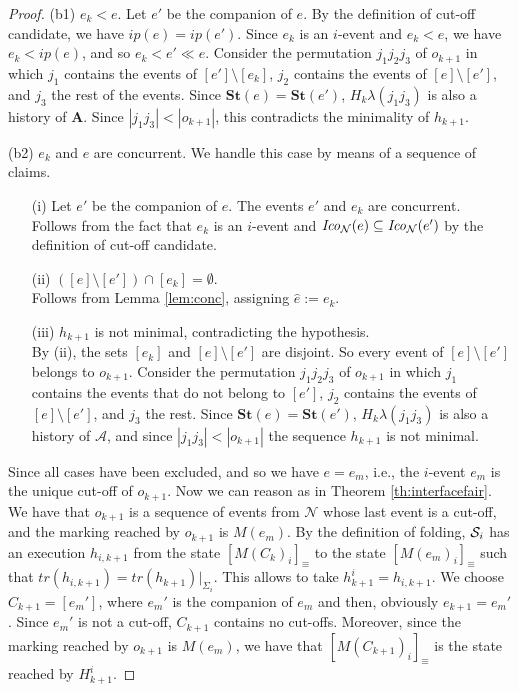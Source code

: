 \documentclass{llncs}
\def\A{\mathcal{A}}
\def\prod{\mathbf{A}}
\def\N{\mathcal{N}}
\def\S{\mathcal{S}}
\def\scause{\ll}
\newcommand{\st}[1]{\mathbf{St}(#1)}
\newcommand{\ma}[1]{M(#1)}
\newcommand{\Coni}[2]{{\it Ico}_{#1}(#2)}
\renewcommand{\S}{{\cal S}}
\def\trace{tr}
\begin{document}
\begin{proof}
\vspace{0.1cm}
\noindent (b1) $e_{k} < e$. Let $e'$ be the companion of $e$. By the definition of cut-off
candidate, we have $ip(e)=ip(e')$. Since $e_{k}$ is an $i$-event and $e_{k} < e$, we have 
$e_{k} < ip(e)$, and so $e_{k} < e' \scause e$. Consider the permutation $j_1j_2j_3$ of
$o_{k+1}$ in which $j_1$ contains the events of $[e'] \setminus [e_{k}]$,
$j_2$ contains the events of $[e] \setminus [e']$, and $j_3$ the rest
of the events. Since $\st{e}=\st{e'}$, $H_k\lambda(j_1j_3)$ is also a history of $\prod$. Since
$|j_1j_3| < |o_{k+1}|$, this contradicts the minimality of $h_{k+1}$.

\vspace{0.1cm}
\noindent (b2) $e_{k}$ and $e$ are concurrent. We handle this case by means 
of a sequence of claims. 
\begin{itemize}
\item[(i)]  Let $e'$ be the companion of $e$. The events $e'$ and $e_{k}$ are concurrent. \\
Follows from the fact that $e_{k}$ is an $i$-event
and $\Coni{\N}{e} \subseteq \Coni{\N}{e'}$ by the definition of cut-off candidate.
\item[(ii)] $([e] \setminus [e']) \cap [e_{k}]=\emptyset$.\\
Follows from Lemma \ref{lem:conc}, assigning $\hat{e} := e_{k}$.
\item[(iii)] $h_{k+1}$ is not minimal, contradicting the hypothesis.\\
By (ii), the sets $[e_{k}]$ and $[e] \setminus [e']$ are disjoint.
So every event of $[e] \setminus [e']$ belongs to $o_{k+1}$.
Consider the permutation $j_1j_2j_3$ of
$o_{k+1}$ in which $j_1$ contains the events that do not belong to $[e']$,
$j_2$ contains the events of $[e] \setminus [e']$, and $j_3$ the rest. 
Since $\st{e}=\st{e'}$, $H_k\lambda(j_1j_3)$ is also a history of $\A$, and since
$|j_1j_3| < |o_{k+1}|$ the sequence $h_{k+1}$ is not minimal.
\end{itemize}

Since all cases have been excluded, and so we have $e=e_m$, i.e., the $i$-event 
$e_m$ is the unique cut-off of $o_{k+1}$. Now we can reason as in Theorem \ref{th:interfacefair}. We have that
$o_{k+1}$ is a sequence of events from $\N$ whose last event is a cut-off, and 
the marking reached by $o_{k+1}$ is $\ma{e_m}$.
By the definition of folding, $\S_i$ has an execution $h_{i,k+1}$ from the state 
$[\ma{C_{k}}_i]_\equiv$ to the state $[\ma{e_m}_i]_\equiv$ such that 
$\trace(h_{i,k+1})=\trace(h_{k+1})|_{\Sigma_i}$. This allows to take $h^i_{k+1}=h_{i,k+1}$. 
We choose $C_{k+1}= [e_m']$, 
where $e_m'$ is the companion of $e_m$ and then, obviously $e_{k+1} = e_m'$. 
Since $e_m'$ is not a cut-off, $C_{k+1}$ contains no cut-offs. Moreover, since the marking 
reached by $o_{k+1}$ is $\ma{e_m}$, we have that $[\ma{C_{k+1}}_i]_\equiv$ is the state reached by 
$H_{k+1}^i$.
\end{proof}
\end{document}
